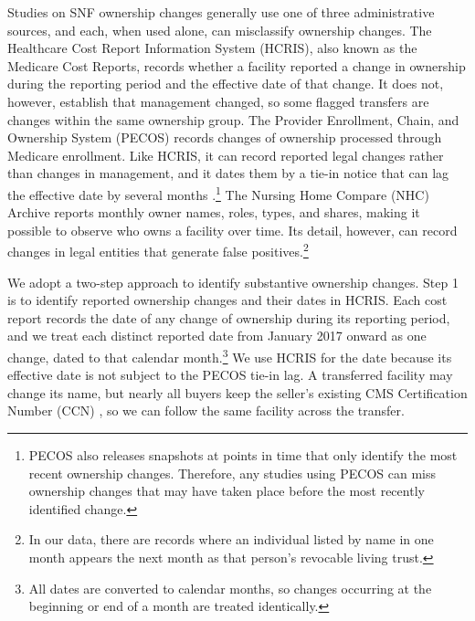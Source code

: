 \documentclass[12pt]{article}
\begin{document}
Studies on SNF ownership changes generally use one of three administrative sources, and each, when used alone, can misclassify ownership changes. The Healthcare Cost Report Information System (HCRIS), also known as the Medicare Cost Reports, records whether a facility reported a change in ownership during the reporting period and the effective date of that change. It does not, however, establish that management changed, so some flagged transfers are changes within the same ownership group. The Provider Enrollment, Chain, and Ownership System (PECOS) records changes of ownership processed through Medicare enrollment. Like HCRIS, it can record reported legal changes rather than changes in management, and it dates them by a tie-in notice that can lag the effective date by several months \citep{CMS2022SNFCHOWGuidance}.\footnote{PECOS also releases snapshots at points in time that only identify the most recent ownership changes. Therefore, any studies using PECOS \citep[e.g.,][]{prusynski_et_al_2025, StevensonEtAl2023, OliveiraBlanco2024} can miss ownership changes that may have taken place before the most recently identified change.} The Nursing Home Compare (NHC) Archive reports monthly owner names, roles, types, and shares, making it possible to observe who owns a facility over time. Its detail, however, can record changes in legal entities that generate false positives.\footnote{In our data, there are records where an individual listed by name in one month appears the next month as that person's revocable living trust.}

We adopt a two-step approach to identify substantive ownership changes. Step 1 is to identify reported ownership changes and their dates in HCRIS. Each cost report records the date of any change of ownership during its reporting period, and we treat each distinct reported date from January 2017 onward as one change, dated to that calendar month.\footnote{All dates are converted to calendar months, so changes occurring at the beginning or end of a month are treated identically.} We use HCRIS for the date because its effective date is not subject to the PECOS tie-in lag. A transferred facility may change its name, but nearly all buyers keep the seller's existing CMS Certification Number (CCN) \citep{CMS2024AppendixPP, eCFR42CFR489.18}, so we can follow the same facility across the transfer.
\end{document}
